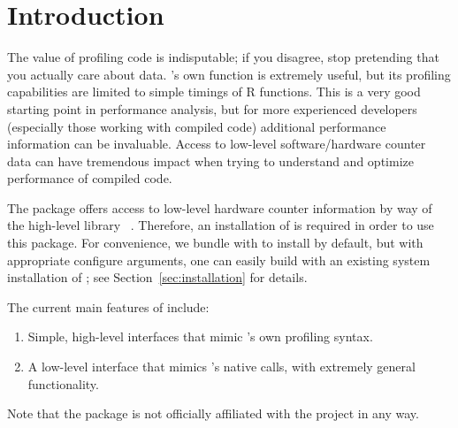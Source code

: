 \section{Introduction}
\label{sec:introduction}

The value of profiling code is indisputable; if you disagree, stop pretending that you actually care about data.  's own  function is extremely useful, but its profiling capabilities are limited to simple timings of R functions. This is a very good starting point in performance analysis, but for more experienced developers (especially those working with compiled code) additional performance information can be invaluable. Access to low-level software/hardware counter data can have tremendous impact when trying to understand and optimize performance of compiled code. 

The \thispackage package offers access to low-level hardware counter information by way of the high-level 
\C library \PAPI~\citep{mucci1999papi}.  Therefore, an installation of \PAPI is required in order to use this package.  For convenience, we bundle \PAPIversion with \thispackage to install by default, but with appropriate configure arguments, one can easily build \thispackage with an existing system installation of \PAPI; see Section~\ref{sec:installation} for details.

The current main features of \thispackage include:
\begin{enumerate}
  \item Simple, high-level interfaces that mimic \R's own profiling syntax.
  \item A low-level interface that mimics \PAPI's native calls, with extremely general functionality.
\end{enumerate}

Note that the  package is not officially affiliated with the  project in any way.